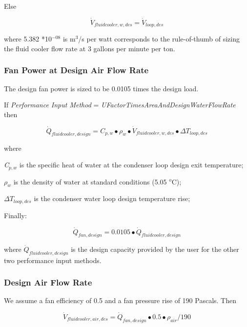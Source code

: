 Else

\begin{equation}
{\dot V_{fluidcooler,w,des}} = {\dot V_{loop,des}}
\end{equation}

where 5.382 *10\(^{-08}\) is m\(^{3}\)/s per watt corresponds to the rule-of-thumb of sizing the fluid cooler flow rate at 3 gallons per minute per ton.

\subsubsection{Fan Power at Design Air Flow Rate}\label{fan-power-at-design-air-flow-rate-2}

The design fan power is sized to be 0.0105 times the design load.

If \emph{Performance Input Method} = \emph{UFactorTimesAreaAndDesignWaterFlowRate} then

\begin{equation}
{\dot Q_{fluidcooler,design}} = {C_{p,w}} \bullet {\rho_w} \bullet {\dot V_{fluidcooler,w,des}} \bullet \Delta {T_{loop,des}}
\end{equation}

where

\emph{C\(_{p,w}\)} is the specific heat of water at the condenser loop design exit temperature;

\emph{\(\rho_{w}\)} is the density of water at standard conditions (5.05 \(^{o}\)C);

\emph{\(\Delta T_{loop,des}\)} is the condenser water loop design temperature rise;

Finally:

\begin{equation}
{\dot Q_{fan,design}} = 0.0105 \bullet {\dot Q_{fluidcooler,design}}
\end{equation}

where \({\dot Q_{fluidcooler,design}}\) is the design capacity provided by the user for the other two performance input methods.

\subsubsection{Design Air Flow Rate}\label{design-air-flow-rate-2}

We assume a fan efficiency of 0.5 and a fan pressure rise of 190 Pascals. Then

\begin{equation}
{\dot V_{fluidcooler,air,des}} = {\dot Q_{fan,design}} \bullet 0.5 \bullet {\rho_{air}}/190
\end{equation}

